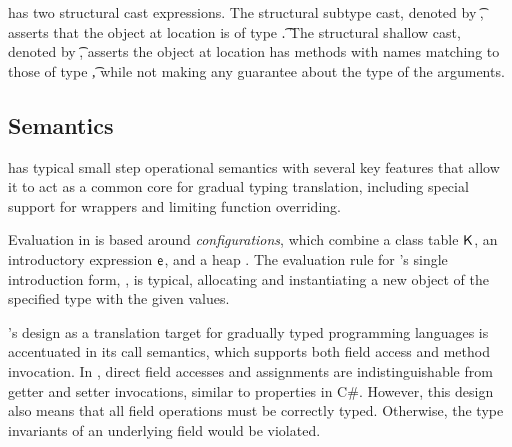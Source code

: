 \documentclass[a4paper,USenglish]{tex/lipics-v2016}
\begin{document}


\kafka has two structural cast expressions. The structural subtype cast,
denoted by \SubCast\t\a, asserts that the object at location \a is of type \t.
The structural shallow cast,  denoted by \ShaCast\t\a, asserts the object at
location \a has methods with names matching to those of type \t, while not
making any guarantee about the type of the arguments.


\subsection{Semantics}

\kafka has typical small step operational semantics with several key
features that allow it to act as a common core for gradual typing
translation, including special support for wrappers and limiting function
overriding.

Evaluation in \kafka is based around \emph{configurations}, which combine a
class table ${\sf{K}}$, an introductory expression ${\sf{e}}$, and a heap \s. The
evaluation rule for \kafka's single introduction form, , is typical,
allocating and instantiating a new object of the specified type with the
given values.

\kafka's design as a translation target for gradually typed programming
languages is accentuated in its call semantics, which supports both field
access and method invocation. In \kafka, direct field accesses and
assignments are indistinguishable from getter and setter invocations,
similar to properties in C\#. However, this design also means that all field
operations must be correctly typed. Otherwise, the type invariants of an
underlying field would be violated.
\end{document}
